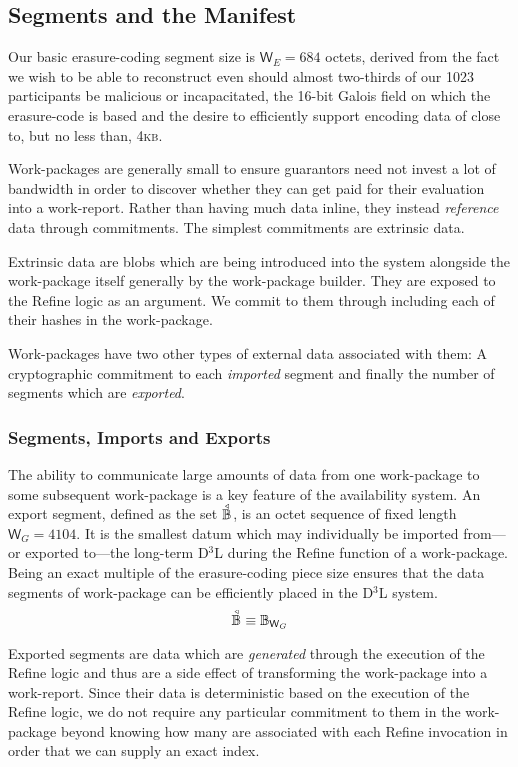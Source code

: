 \subsection{Segments and the Manifest}

Our basic erasure-coding segment size is $\mathsf{W}_E = 684$ octets, derived from the fact we wish to be able to reconstruct even should almost two-thirds of our 1023 participants be malicious or incapacitated, the 16-bit Galois field on which the erasure-code is based and the desire to efficiently support encoding data of close to, but no less than, 4\textsc{kb}.

Work-packages are generally small to ensure guarantors need not invest a lot of bandwidth in order to discover whether they can get paid for their evaluation into a work-report. Rather than having much data inline, they instead \emph{reference} data through commitments. The simplest commitments are extrinsic data.

Extrinsic data are blobs which are being introduced into the system alongside the work-package itself generally by the work-package builder. They are exposed to the Refine logic as an argument. We commit to them through including each of their hashes in the work-package.

Work-packages have two other types of external data associated with them: A cryptographic commitment to each \emph{imported} segment and finally the number of segments which are \emph{exported}.

\subsubsection{Segments, Imports and Exports}

The ability to communicate large amounts of data from one work-package to some subsequent work-package is a key feature of the \Jam availability system. An export segment, defined as the set $\segment$, is an octet sequence of fixed length $\mathsf{W}_G = 4104$. It is the smallest datum which may individually be imported from---or exported to---the long-term D$^3$L during the Refine function of a work-package. Being an exact multiple of the erasure-coding piece size ensures that the data segments of work-package can be efficiently placed in the D$^3$L system.
\begin{equation}\label{eq:segment}
  \segment \equiv \blob[\mathsf{W}_G]
\end{equation}

Exported segments are data which are \emph{generated} through the execution of the Refine logic and thus are a side effect of transforming the work-package into a work-report. Since their data is deterministic based on the execution of the Refine logic, we do not require any particular commitment to them in the work-package beyond knowing how many are associated with each Refine invocation in order that we can supply an exact index.

